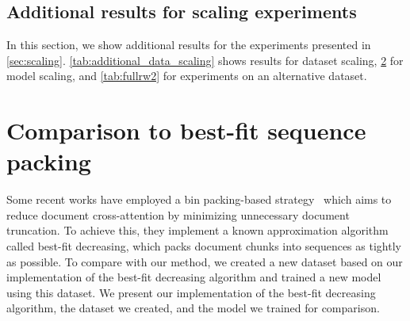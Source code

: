 \begin{figure}[h]
    \centering
    \begin{minipage}{0.5\textwidth}
         
         \label{tab:length_bias_additional}
    \end{minipage}
\end{figure}


\subsection{Additional results for scaling experiments} 
In this section, we show additional results for the experiments presented in \cref{sec:scaling}. \cref{tab:additional_data_scaling} shows results for dataset scaling, \cref{tab:additionaL_model_scaling} for model scaling, and \cref{tab:fullrw2} for experiments on an alternative dataset.



\begin{figure}[h]
    \begin{minipage}{0.49\textwidth}
         
         \label{tab:additional_data_scaling}
    \end{minipage}
    \hfill
    \begin{minipage}{0.49\textwidth}
         
         \label{tab:additionaL_model_scaling}
    \end{minipage}
\end{figure}


\label{sec:additional_dcl}
\begin{table}[h]
    
\end{table}

\section{Comparison to best-fit sequence packing}\label{sec:packing_detail}
Some recent works have employed a bin packing-based strategy~\citep{ding2024fewer} which aims to reduce document cross-attention by minimizing unnecessary document truncation. To achieve this, they implement a known approximation algorithm called best-fit decreasing, which packs document chunks into sequences as tightly as possible. To compare with our method, we created a new dataset based on our implementation of the best-fit decreasing algorithm and trained a new model using this dataset. We present our implementation of the best-fit decreasing algorithm, the dataset we created, and the model we trained for comparison.

